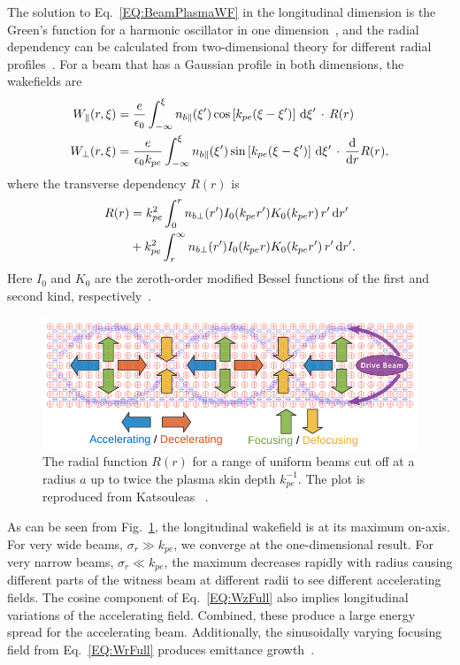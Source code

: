 The solution to Eq.~\ref{EQ:BeamPlasmaWF} in the longitudinal dimension is the Green’s function for a harmonic oscillator in one dimension~\cite{katsouleas:1987}, and the radial dependency can be calculated from two-dimensional theory for different radial profiles~\cite{chen:1987}. For a beam that has a Gaussian profile in both dimensions, the wakefields are
\begin{align}
    W_{\parallel}(r,\xi) &= \frac{e}{\epsilon_{0}}
        \int_{-\infty}^{\xi} n_{b\parallel}(\xi^{\prime}) \cos\left[k_{pe}(\xi-\xi^{\prime})\right] \,\mathrm{d}\xi^{\prime} \,\cdot\, R(r) \label{EQ:WzFull} \\
    W_{\perp}(r,\xi) &= \frac{e}{\epsilon_{0}k_{pe}}
        \int_{-\infty}^{\xi} n_{b\parallel}(\xi^{\prime}) \sin\left[k_{pe}(\xi-\xi^{\prime})\right] \,\mathrm{d}\xi^{\prime} \,\cdot\, \frac{\mathrm{d}}{\mathrm{d}r}R(r), \label{EQ:WrFull}
\end{align}
where the transverse dependency $R(r)$ is
\begin{align}
    R(r) &= k_{pe}^{2} \int_{0}^{r} n_{b\perp}(r^{\prime}) I_{0}(k_{pe}r^{\prime})
           K_{0}(k_{pe}r) \,r^{\prime}\,\mathrm{d} r^{\prime} \nonumber \\
         &+ k_{pe}^{2} \int_{r}^{\infty} n_{b\perp}(r^{\prime}) I_{0}(k_{pe}r)
           K_{0}(k_{pe}r^{\prime}) \,r^{\prime}\,\mathrm{d} r^{\prime}. \label{EQ:WFRadial}
\end{align}
Here $I_{0}$ and $K_{0}$ are the zeroth-order modified Bessel functions of the first and second kind, respectively~\cite{chen:1987,muggli:2017}.

\begin{figure}[hbt]
    \centering
    \includegraphics[width=0.8125\linewidth,trim={0mm 0mm 0mm 0mm},clip]{figures/RepKatsouleas1987}
    \caption{\label{Fig:BPI:Kat87} The radial function $R(r)$ for a range of uniform beams cut off at a radius $a$ up to twice the plasma skin depth $k_{pe}^{-1}$. The plot is reproduced from Katsouleas \etal~\cite{katsouleas:1987}.}
\end{figure}

As can be seen from Fig.~\ref{Fig:BPI:Kat87}, the longitudinal wakefield is at its maximum on-axis. For very wide beams, $\sigma_{r} \gg k_{pe}$, we converge at the one-dimensional result. For very narrow beams, $\sigma_{r} \ll k_{pe}$, the maximum decreases rapidly with radius causing different parts of the witness beam at different radii to see different accelerating fields. The cosine component of Eq.~\ref{EQ:WzFull} also implies longitudinal variations of the accelerating field. Combined, these produce a large energy spread for the accelerating beam. Additionally, the sinusoidally varying focusing field from Eq.~\ref{EQ:WrFull} produces emittance growth~\cite{muggli:2017,katsouleas:1987}.

